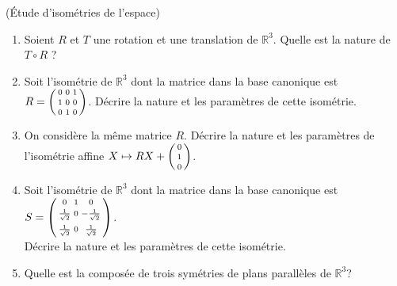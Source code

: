 \documentclass[a4paper,12pt,reqno]{amsart}
\begin{document}
\begin{exo} (Étude d'isométries de l'espace)
  \begin{enumerate}
    \item Soient $R$ et $T$ une rotation et une translation de $\mathbb{R}^{3}$. Quelle est la nature de $T \circ R$ ?
    \item Soit l'isométrie de $\mathbb{R}^{3}$ dont la matrice dans la base canonique est
      $R=
          \begin{psmallmatrix}
            0 & 0 & 1 \\[3pt]
            1 & 0 & 0 \\[3pt]
            0 & 1 & 0
          \end{psmallmatrix}
      $.
      Décrire la nature et les paramètres de cette isométrie.
      \item On considère la même matrice $R$. Décrire la nature et les paramètres de l'isométrie affine
        $
          X \mapsto
          RX+
          \begin{psmallmatrix}
            0 \\[3pt]
            1 \\[3pt]
            0
          \end{psmallmatrix}
        $.\vspace{-11pt}
    \item Soit l'isométrie de $\mathbb{R}^{3}$ dont la matrice dans la base canonique est
      $S=
          \begin{psmallmatrix}
                    0         & 1 &         0          \\[3pt]
            \frac{1}{\sqrt{2}} & 0 & -\frac{1}{\sqrt{2}} \\[3pt]
            \frac{1}{\sqrt{2}} & 0 &  \frac{1}{\sqrt{2}}
          \end{psmallmatrix}
      $.\\[-3pt]
      Décrire la nature et les paramètres de cette isométrie.
    \item Quelle est la composée de trois symétries de plans parallèles de $\mathbb{R}^{3}$?
  \end{enumerate}
\end{exo}
\end{document}
